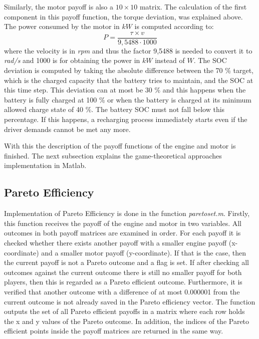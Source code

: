 Similarly, the motor payoff is also a $10 \times 10$ matrix. The calculation of the first component in this payoff function, the torque deviation, was explained above. The power consumed by the motor in $kW$ is computed according to:
\begin{equation}
P = \frac{\tau \times v}{9,5488 \cdot 1000}
\end{equation}
where the velocity is in \textit{rpm} and thus the factor 9,5488 is needed to convert it to \textit{rad/s} and 1000 is for obtaining the power in $kW$ instead of $W$. The SOC deviation is computed by taking the absolute difference between the 70 \% target, which is the charged capacity that the battery tries to maintain, and the SOC at this time step. This deviation can at most be 30 \% and this happens when the battery is fully charged at 100 \% or when the battery is charged at its minimum allowed charge state of 40 \%. The battery SOC must not fall below this percentage. If this happens, a recharging process immediately starts even if the driver demands cannot be met any more.

With this the description of the payoff functions of the engine and motor is finished. The next subsection explains the game-theoretical approaches implementation in Matlab.

\subsection{Pareto Efficiency}
Implementation of Pareto Efficiency is done in the function \textit{paretoset.m}. Firstly, this function receives the payoff of the engine and motor in two variables. All outcomes in both payoff matrices are examined in order. For each payoff it is checked whether there exists another payoff with a smaller engine payoff (x-coordinate) and a smaller motor payoff (y-coordinate). If that is the case, then the current payoff is not a Pareto outcome and a flag is set. If after checking all outcomes against the current outcome there is still no smaller payoff for both players, then this is regarded as a Pareto efficient outcome. Furthermore, it is verified that another outcome with a difference of at most 0.000001 from the current outcome is not already saved in the Pareto efficiency vector. The function outputs the set of all Pareto efficient payoffs in a matrix where each row holds the x and y values of the Pareto outcome. In addition, the indices of the Pareto efficient points inside the payoff matrices are returned in the same way.

